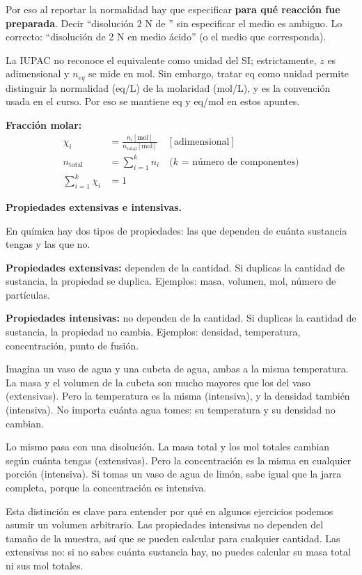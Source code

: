 Por eso al reportar la normalidad hay que especificar \textbf{para qué reacción 
fue preparada}. Decir ``disolución 2 N de '' sin especificar el medio es 
ambiguo. Lo correcto: ``disolución de  2 N en medio ácido'' (o el medio 
que corresponda).

\begin{notaimportante}
La IUPAC no reconoce el equivalente como unidad del SI; estrictamente, \(z\) es 
adimensional y \(n_{eq}\) se mide en mol. Sin embargo, tratar eq como unidad 
permite distinguir la normalidad (eq/L) de la molaridad (mol/L), y es la 
convención usada en el curso. Por eso se mantiene eq y eq/mol en estos apuntes.
\end{notaimportante}

\medskip
\textbf{Fracción molar:}
\begin{align*}
    \chi_i &= \frac{n_i[\mathrm{mol}]}{n_{\mathrm{total}}[\mathrm{mol}]}
    \quad [\text{adimensional}] \\[4pt]
    n_{\mathrm{total}} &= \sum_{i=1}^{k} n_i
    \quad \text{($k$ = número de componentes)} \\[4pt]
    \sum_{i=1}^{k} \chi_i &= 1
\end{align*}

\begin{notafija}
\textbf{Propiedades extensivas e intensivas.}

En química hay dos tipos de propiedades: las que dependen de cuánta sustancia 
tengas y las que no.

\textbf{Propiedades extensivas:} dependen de la cantidad. Si duplicas la 
cantidad de sustancia, la propiedad se duplica. Ejemplos: masa, volumen, mol, 
número de partículas.

\textbf{Propiedades intensivas:} no dependen de la cantidad. Si duplicas la 
cantidad de sustancia, la propiedad no cambia. Ejemplos: densidad, temperatura, 
concentración, punto de fusión.

\medskip
Imagina un vaso de agua y una cubeta de agua, ambas a la misma temperatura. La 
masa y el volumen de la cubeta son mucho mayores que los del vaso (extensivas). 
Pero la temperatura es la misma (intensiva), y la densidad también (intensiva). 
No importa cuánta agua tomes: su temperatura y su densidad no cambian.

Lo mismo pasa con una disolución. La masa total y los mol totales cambian 
según cuánta tengas (extensivas). Pero la concentración es la misma en cualquier 
porción (intensiva). Si tomas un vaso de agua de limón, sabe igual que la jarra 
completa, porque la concentración es intensiva.

\medskip
Esta distinción es clave para entender por qué en algunos ejercicios podemos 
asumir un volumen arbitrario. Las propiedades intensivas no dependen del tamaño 
de la muestra, así que se pueden calcular para cualquier cantidad. Las 
extensivas no: si no sabes cuánta sustancia hay, no puedes calcular su masa 
total ni sus mol totales.
\end{notafija}

